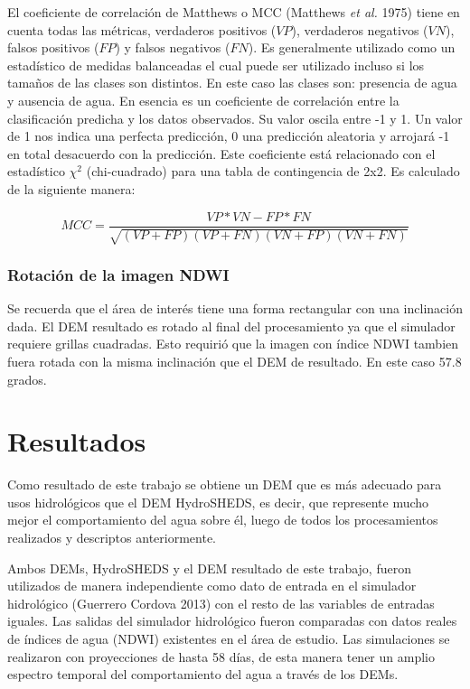 \documentclass[10pt,a4paper, twoside]{report}
\begin{document}
El coeficiente de correlación de Matthews o MCC (Matthews \textit{et al.} 1975) tiene en cuenta todas las métricas, verdaderos positivos ($VP$), verdaderos negativos ($VN$), falsos positivos ($FP$) y falsos negativos ($FN$). Es generalmente utilizado como un estadístico de medidas balanceadas el cual puede ser utilizado incluso si los tamaños de las clases son distintos. En este caso las clases son: presencia de agua y ausencia de agua. En esencia es un coeficiente de correlación entre la clasificación predicha y los datos observados. Su valor oscila entre -1 y 1. Un valor de 1 nos indica una perfecta predicción, 0 una predicción aleatoria y arrojará -1 en total desacuerdo con la predicción. Este coeficiente está relacionado con el estadístico ${\chi}^2$ (chi-cuadrado) para una tabla de contingencia de 2x2. Es calculado de la siguiente manera:


\begin{equation}
MCC=\frac{VP*VN - FP*FN}{\sqrt{(VP+FP)(VP+FN)(VN+FP)(VN+FN)}}
\end{equation}



\subsection{Rotación de la imagen NDWI}

Se recuerda que el área de interés tiene una forma rectangular con una inclinación dada. El DEM resultado es rotado al final del procesamiento ya que el simulador requiere grillas cuadradas. Esto requirió que la imagen con índice NDWI tambien fuera rotada con la misma inclinación que el DEM de resultado. En este caso 57.8 grados.



\chapter{Resultados}

Como resultado de este trabajo se obtiene un DEM que es más adecuado para usos hidrológicos que el DEM HydroSHEDS, es decir, que represente mucho mejor el comportamiento del agua sobre él, luego de todos los procesamientos realizados y descriptos anteriormente.


Ambos DEMs, HydroSHEDS y el DEM resultado de este trabajo, fueron utilizados de manera independiente como dato de entrada en el simulador hidrológico (Guerrero Cordova 2013) con el resto de las variables de entradas iguales. Las salidas del simulador hidrológico fueron comparadas con datos reales de índices de agua (NDWI) existentes en el área de estudio. Las simulaciones se realizaron con proyecciones de hasta 58 días, de esta manera tener un amplio espectro temporal del comportamiento del agua a través de los DEMs.
\end{document}

